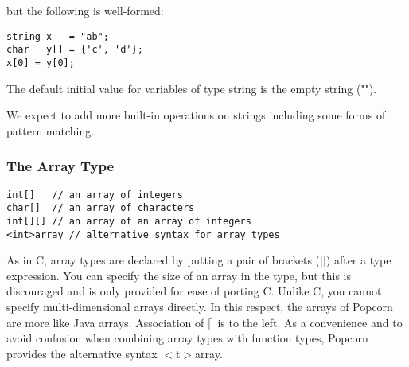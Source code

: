 \documentclass[titlepage,10pt]{article}
\begin{document}
but the following is well-formed:


\begin{verbatim}
string x   = "ab"; 
char   y[] = {'c', 'd'}; 
x[0] = y[0]; 
\end{verbatim}

The default initial value for variables of type string is the empty
string ("").

We expect to add more built-in operations on strings including some
forms of pattern matching.

\subsubsection{The Array Type}


\begin{verbatim}
int[]   // an array of integers
char[]  // an array of characters
int[][] // an array of an array of integers
<int>array // alternative syntax for array types
\end{verbatim}


As in C, array types are declared by putting a pair of brackets ([])
after a type expression.   You can specify the size of an array in the
type, but this is discouraged and is only provided for ease of porting
C. Unlike C, you cannot specify multi-dimensional arrays directly.  In
this respect, the arrays of Popcorn are more like Java arrays.
Association of [] is to the left.  As a convenience and to avoid
confusion when combining array types with function types, Popcorn
provides the alternative syntax $<$t$>$array.
\end{document}
